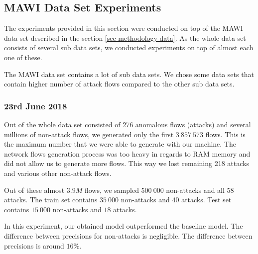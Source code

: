 \documentclass{article}
\begin{document}
\clearpage

\subsection{MAWI Data Set Experiments}\label{sec-mawi-experiments}


The experiments provided in this section were conducted on top of the MAWI data set described in the section \ref{sec-methodology-data}. As the whole data set consists of several sub data sets, we conducted experiments on top of almost each one of these.

The MAWI data set contains a lot of sub data sets. We chose some data sets that contain higher number of attack flows compared to the other sub data sets.

\subsubsection{23rd June 2018}

Out of the whole data set consisted of 276 anomalous flows (attacks) and several millions of non-attack flows, we generated only the first $3\ 857\ 573$ flows. This is the maximum number that we were able to generate with our machine. The network flows generation process was too heavy in regards to RAM memory and did not allow us to generate more flows. This way we lost remaining 218 attacks and various other non-attack flows.

Out of these almost $3.9M$ flows, we sampled $500\ 000$ non-attacks and all 58 attacks. The train set contains $35\ 000$ non-attacks and $40$ attacks. Test set contains $15\ 000$ non-attacks and $18$ attacks.

In this experiment, our obtained model outperformed the baseline model. The difference between precisions for non-attacks is negligible. The difference between precisions is around $16\%$.
\end{document}
